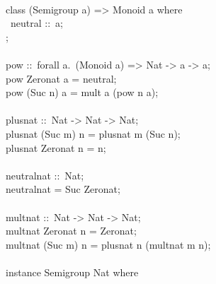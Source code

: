 \begin{isabellebody}
\begin{isamarkuptext}
\hspace*{0pt}\\
\hspace*{0pt}class (Semigroup a) => Monoid a where {}\\
\hspace*{0pt} ~neutral ::~a;\\
\hspace*{0pt}{\char125};\\
\hspace*{0pt}\\
\hspace*{0pt}pow ::~forall a.~(Monoid a) => Nat -> a -> a;\\
\hspace*{0pt}pow Zero{}nat a = neutral;\\
\hspace*{0pt}pow (Suc n) a = mult a (pow n a);\\
\hspace*{0pt}\\
\hspace*{0pt}plus{}nat ::~Nat -> Nat -> Nat;\\
\hspace*{0pt}plus{}nat (Suc m) n = plus{}nat m (Suc n);\\
\hspace*{0pt}plus{}nat Zero{}nat n = n;\\
\hspace*{0pt}\\
\hspace*{0pt}neutral{}nat ::~Nat;\\
\hspace*{0pt}neutral{}nat = Suc Zero{}nat;\\
\hspace*{0pt}\\
\hspace*{0pt}mult{}nat ::~Nat -> Nat -> Nat;\\
\hspace*{0pt}mult{}nat Zero{}nat n = Zero{}nat;\\
\hspace*{0pt}mult{}nat (Suc m) n = plus{}nat n (mult{}nat m n);\\
\hspace*{0pt}\\
\hspace*{0pt}instance Semigroup Nat where {}\\

\end{isamarkuptext}
\end{isabellebody}
